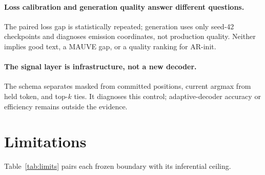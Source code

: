 \documentclass{article}
\newcommand{\armA}{AR-init}
\begin{document}
\paragraph{Loss calibration and generation quality answer different
questions.}
The paired loss gap is statistically repeated; generation uses only seed-42
checkpoints and diagnoses emission coordinates, not production quality.
Neither implies good text, a MAUVE gap, or a quality ranking for \armA{}.

\paragraph{The signal layer is infrastructure, not a new decoder.}
The schema separates masked from committed positions, current argmax from held
token, and top-$k$ ties.  It diagnoses this control; adaptive-decoder accuracy
or efficiency remains outside the evidence.

\section{Limitations}
\label{sec:limitations}

Table~\ref{tab:limits} pairs each frozen boundary with its inferential ceiling.
\end{document}
